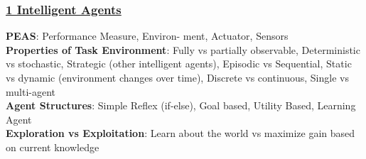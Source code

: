 \documentclass{article}
\begin{document}
\singlespacing %

\pagestyle{fancy}
\fancyhf{}
\renewcommand{\headrulewidth}{0pt}


\titlespacing*{\subsubsection}{0pt}{0pt}{0pt}

{\scriptsize
\begin{multicols*}{3}

\subsubsection*{\underline{1 Intelligent Agents}}
\textbf{PEAS}: Performance Measure, Environ- ment, Actuator, Sensors\\
\textbf{Properties of Task Environment}: Fully vs partially observable, Deterministic vs stochastic, Strategic (other intelligent agents), Episodic vs Sequential, Static vs dynamic (environment changes over time), Discrete vs continuous, Single vs multi-agent \\
\textbf{Agent Structures}: Simple Reflex (if-else), Goal based, Utility Based, Learning Agent\\ 
\textbf{Exploration vs Exploitation}: Learn about the world vs maximize gain based on current knowledge

\end{multicols*}}
\end{document}
